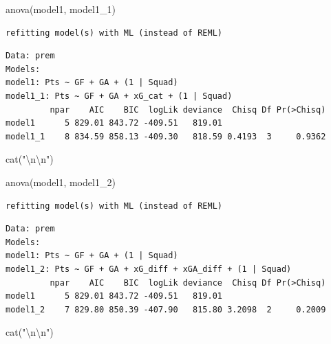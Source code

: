 \documentclass[
  letterpaper,
  DIV=11,
  numbers=noendperiod]{scrartcl}
\newenvironment{Shaded}{\begin{snugshade}}{\end{snugshade}}
\newcommand{\FunctionTok}[1]{\textcolor[rgb]{0.28,0.35,0.67}{#1}}
\newcommand{\NormalTok}[1]{\textcolor[rgb]{0.00,0.23,0.31}{#1}}
\newcommand{\SpecialCharTok}[1]{\textcolor[rgb]{0.37,0.37,0.37}{#1}}
\newcommand{\StringTok}[1]{\textcolor[rgb]{0.13,0.47,0.30}{#1}}
\begin{document}
\begin{Shaded}
\begin{Highlighting}[]
\FunctionTok{anova}\NormalTok{(model1, model1\_1)}
\end{Highlighting}
\end{Shaded}

\begin{verbatim}
refitting model(s) with ML (instead of REML)
\end{verbatim}

\begin{verbatim}
Data: prem
Models:
model1: Pts ~ GF + GA + (1 | Squad)
model1_1: Pts ~ GF + GA + xG_cat + (1 | Squad)
         npar    AIC    BIC  logLik deviance  Chisq Df Pr(>Chisq)
model1      5 829.01 843.72 -409.51   819.01                     
model1_1    8 834.59 858.13 -409.30   818.59 0.4193  3     0.9362
\end{verbatim}

\begin{Shaded}
\begin{Highlighting}[]
\FunctionTok{cat}\NormalTok{(}\StringTok{"}\SpecialCharTok{\textbackslash{}n\textbackslash{}n}\StringTok{"}\NormalTok{)}
\end{Highlighting}
\end{Shaded}

\begin{Shaded}
\begin{Highlighting}[]
\FunctionTok{anova}\NormalTok{(model1, model1\_2)}
\end{Highlighting}
\end{Shaded}

\begin{verbatim}
refitting model(s) with ML (instead of REML)
\end{verbatim}

\begin{verbatim}
Data: prem
Models:
model1: Pts ~ GF + GA + (1 | Squad)
model1_2: Pts ~ GF + GA + xG_diff + xGA_diff + (1 | Squad)
         npar    AIC    BIC  logLik deviance  Chisq Df Pr(>Chisq)
model1      5 829.01 843.72 -409.51   819.01                     
model1_2    7 829.80 850.39 -407.90   815.80 3.2098  2     0.2009
\end{verbatim}

\begin{Shaded}
\begin{Highlighting}[]
\FunctionTok{cat}\NormalTok{(}\StringTok{"}\SpecialCharTok{\textbackslash{}n\textbackslash{}n}\StringTok{"}\NormalTok{)}
\end{Highlighting}
\end{Shaded}
\end{document}
